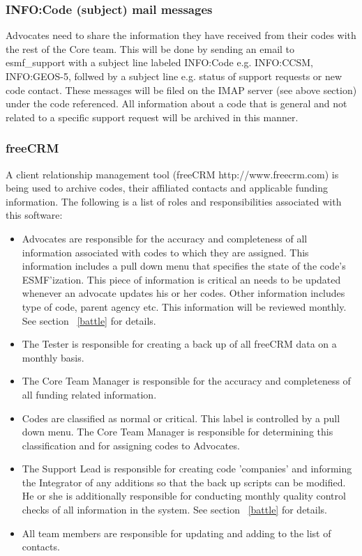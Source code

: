 \subsubsection{INFO:Code (subject) mail messages}
\label{infomail}
Advocates need to share the information they have received from their codes with the rest of the Core team. This will be done by sending an email to esmf\_support with a subject line labeled INFO:Code e.g. INFO:CCSM, INFO:GEOS-5, follwed by a subject line e.g. status of support requests or new code contact.  These messages will be filed on the IMAP server (see above section) under the code referenced. All information about a code that is general and not related to a specific support request will be archived in this manner. 

\subsubsection{freeCRM}
A client relationship management tool (freeCRM http://www.freecrm.com) is being used to archive codes, their affiliated contacts and applicable funding information. The following is a list of roles and responsibilities associated with this software:
\begin{itemize}
\item Advocates are responsible for the accuracy and completeness of all information associated with codes to which they are assigned.  This information includes a pull down menu that specifies the state of the code's ESMF'ization. This piece of information is critical an needs to be updated whenever an advocate updates his or her codes. Other information includes type of code, parent agency etc. This information will be reviewed monthly. See section ~\ref{battle} for details.
\item The Tester is responsible for creating a back up of all freeCRM data on a monthly basis.
\item The Core Team Manager is responsible for the accuracy and completeness of all funding related information.
\item Codes are classified as normal or critical. This label is controlled by a pull down menu. The Core Team Manager is responsible for determining this classification and for assigning codes to Advocates.
\item The Support Lead is responsible for creating code 'companies' and informing the Integrator of any additions so that the back up scripts can be modified. He or she is additionally responsible for conducting monthly quality control checks of all information in the system. See section ~\ref{battle} for details.
\item All team members are responsible for updating and adding to the list of contacts. 
\end{itemize} 

